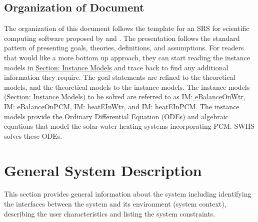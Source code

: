 \documentclass[12pt]{article}
\begin{document}
\subsection{Organization of Document}
\label{Sec:DocOrg}
The organization of this document follows the template for an SRS for scientific computing software proposed by \cite{dParnas1972} and \cite{parnasClements1984}. The presentation follows the standard pattern of presenting goals, theories, definitions, and assumptions. For readers that would like a more bottom up approach, they can start reading the instance models in \hyperref[Sec:IMs]{Section: Instance Models} and trace back to find any additional information they require.
The goal statements are refined to the theoretical models, and the theoretical models to the instance models. The instance models (\hyperref[Sec:IMs]{Section: Instance Models}) to be solved are referred to as \hyperref[IM:eBalanceOnWtr]{IM: eBalanceOnWtr}, \hyperref[IM:eBalanceOnPCM]{IM: eBalanceOnPCM}, \hyperref[IM:heatEInWtr]{IM: heatEInWtr}, and \hyperref[IM:heatEInPCM]{IM: heatEInPCM}. The instance models provide the Ordinary Differential Equation (ODEs) and algebraic equations that model the solar water heating systems incorporating PCM. SWHS solves these ODEs.
\section{General System Description}
\label{Sec:GenSysDesc}
This section provides general information about the system including identifying the interfaces between the system and its environment (system context), describing the user characteristics and listing the system constraints.
\end{document}

